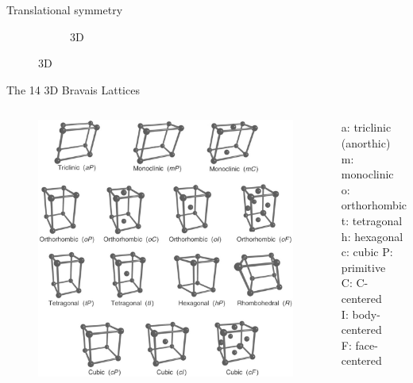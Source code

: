 \documentclass[aspectratio=169]{beamer}
\begin{document}
\begin{frame}{Translational symmetry}
\begin{figure}
\begin{subfigure}{0.25\textwidth}
                \caption{3D}
            \end{subfigure}
        \end{figure}

    \end{frame}


    \begin{frame}{The 14 3D Bravais Lattices}
        \begin{columns}
            \begin{figure}
                \centering
                \includegraphics[width=0.6\linewidth]{lectures/figures/7_bravais_lattices.jpg}
            \end{figure}
            a: triclinic (anorthic)\\
            m: monoclinic\\
            o: orthorhombic\\
            t: tetragonal\\
            h: hexagonal\\
            c: cubic\newline
            \newline
            P: primitive\\
            C: C-centered\\
            I: body-centered\\
            F: face-centered
        \end{columns}

    \end{frame}
\end{document}
